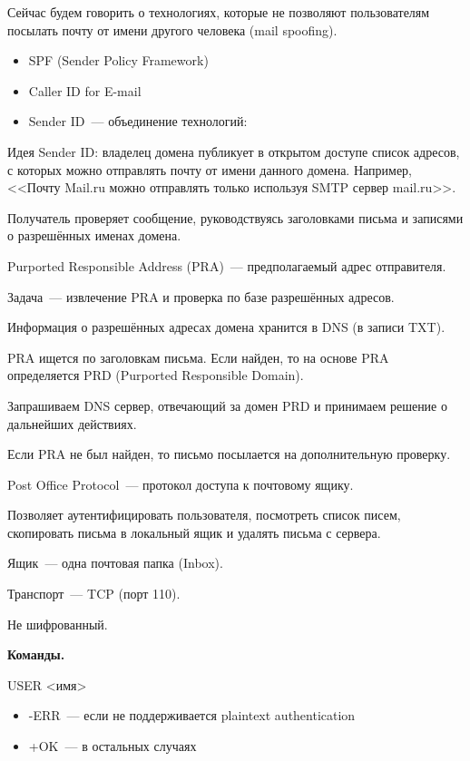 
Сейчас будем говорить о технологиях, которые не позволяют пользователям посылать почту от имени другого человека (mail spoofing).

\begin{itemize}
    \item SPF (Sender Policy Framework) 
    \item Caller ID for E-mail 
    \item Sender ID~--- объединение технологий:
\end{itemize}

Идея Sender ID: владелец домена публикует в открытом доступе список адресов, с которых можно отправлять почту от имени данного домена. Например, <<Почту Mail.ru можно отправлять только используя SMTP сервер mail.ru>>.

Получатель проверяет сообщение, руководствуясь заголовками письма и записями о разрешённых именах домена.

Purported Responsible Address (PRA)~--- предполагаемый адрес отправителя.

Задача~--- извлечение PRA и проверка по базе разрешённых адресов.

Информация о разрешённых адресах домена хранится в DNS (в записи TXT).

PRA ищется по заголовкам письма. Если найден, то на основе PRA определяется PRD (Purported Responsible Domain).

Запрашиваем DNS сервер, отвечающий за домен PRD и принимаем решение о дальнейших действиях.

Если PRA не был найден, то письмо посылается на дополнительную проверку.


Post Office Protocol~--- протокол доступа к почтовому ящику.

Позволяет аутентифицировать пользователя, посмотреть список писем, скопировать письма в локальный ящик и удалять письма с сервера.

Ящик~--- одна почтовая папка (Inbox).

Транспорт~--- TCP (порт 110).

Не шифрованный.

{\bf Команды.}

USER <имя>
\begin{itemize}
    \item -ERR~--- если не поддерживается plaintext authentication
    \item +OK~--- в остальных случаях
\end{itemize}

